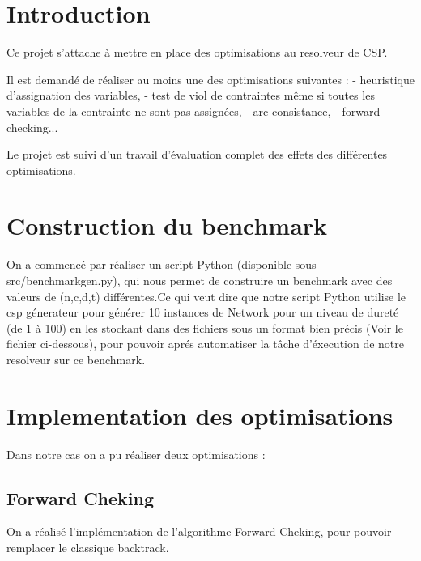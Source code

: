 \documentclass[oneside,13pt,a4paper]{article}
\begin{document}

\parskip=5pt



\parskip=5pt

\section{Introduction}
Ce projet s'attache à mettre en place des optimisations au resolveur de CSP.

Il est demandé de réaliser au moins une des optimisations suivantes : 
- heuristique d'assignation des variables, 
- test de viol de contraintes même si toutes les variables de la contrainte ne sont pas assignées, 
- arc-consistance, 
- forward checking...

Le projet est suivi d'un travail d'évaluation complet des effets des différentes optimisations.


\section {Construction du benchmark}
On a commencé par réaliser un script Python (disponible sous src/benchmarkgen.py), qui nous permet de construire un benchmark avec des valeurs  de (n,c,d,t) différentes.Ce qui veut dire que notre script Python utilise le csp génerateur pour générer 10 instances de Network pour un  niveau de dureté (de 1 à 100) en les stockant dans des fichiers sous un format bien précis (Voir le fichier ci-dessous), pour pouvoir aprés automatiser la tâche d'éxecution de notre resolveur sur ce benchmark. 



\section{Implementation des optimisations}

Dans notre cas on a pu réaliser deux optimisations : 

\subsection{Forward Cheking}

On a réalisé l'implémentation de l'algorithme Forward Cheking, pour pouvoir remplacer le classique backtrack.
\end{document}
